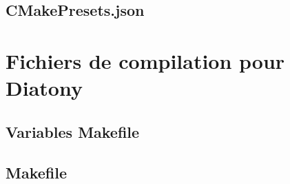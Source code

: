 \subsection{CMakePresets.json}


\newpage
\section{Fichiers de compilation pour Diatony}

\subsection{Variables Makefile}



\subsection{Makefile}





